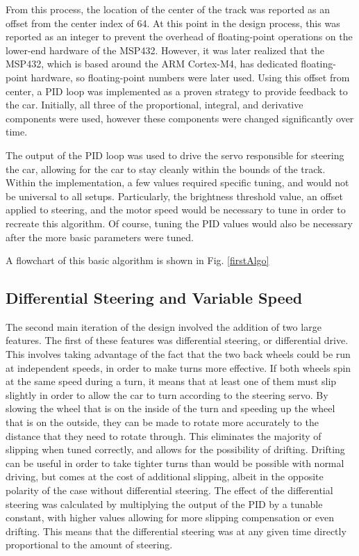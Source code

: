 \documentclass[conference]{IEEEtran}
\begin{document}
    From this process, the location of the center of the track was reported as an offset from the center index of 64.
    At this point in the design process, this was reported as an integer to prevent the overhead of floating-point operations on the lower-end hardware
    of the MSP432.
    However, it was later realized that the MSP432, which is based around the ARM Cortex-M4, has dedicated floating-point hardware, so floating-point numbers were later used.
    Using this offset from center, a PID loop was implemented as a proven strategy to provide feedback to the car. Initially, all three of the proportional, integral, and derivative
    components were used, however these components were changed significantly over time.

    The output of the PID loop was used to drive the servo responsible for steering the car, allowing for the car to stay cleanly within the bounds
    of the track.
    Within the implementation, a few values required specific tuning, and would not be universal to all setups.
    Particularly, the brightness threshold value, an offset applied to steering, and the motor speed would be necessary to tune in order to recreate this algorithm.
    Of course, tuning the PID values would also be necessary after the more basic parameters were tuned.

    A flowchart of this basic algorithm is shown in Fig. \ref{firstAlgo}

\subsection{Differential Steering and Variable Speed}

    The second main iteration of the design involved the addition of two large features.
    The first of these features was differential steering, or differential drive.
    This involves taking advantage of the fact that the two back wheels could be run at independent speeds, in order to make turns more effective.
    If both wheels spin at the same speed during a turn, it means that at least one of them must slip slightly in order to allow the car to turn
    according to the steering servo. By slowing the wheel that is on the inside of the turn and speeding up the wheel that is on the outside,
    they can be made to rotate more accurately to the distance that they need to rotate through. This eliminates the majority of slipping when tuned
    correctly, and allows for the possibility of drifting.
    Drifting can be useful in order to take tighter turns than would be possible with normal driving, but comes at the cost of additional slipping,
    albeit in the opposite polarity of the case without differential steering.
    The effect of the differential steering was calculated by multiplying the output of the PID by a tunable constant, with higher values allowing for
    more slipping compensation or even drifting.
    This means that the differential steering was at any given time directly proportional to the amount of steering.
\end{document}
